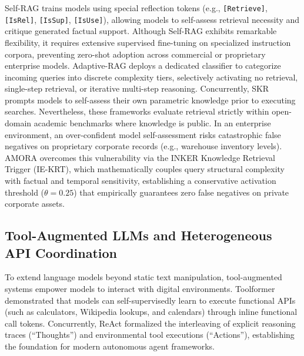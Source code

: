 \documentclass[fleqn,10pt]{article}
\begin{document}
Self-RAG \cite{asai2023selfrag} trains models using special reflection tokens (e.g., \texttt{[Retrieve]}, \texttt{[IsRel]}, \texttt{[IsSup]}, \texttt{[IsUse]}), allowing models to self-assess retrieval necessity and critique generated factual support. Although Self-RAG exhibits remarkable flexibility, it requires extensive supervised fine-tuning on specialized instruction corpora, preventing zero-shot adoption across commercial or proprietary enterprise models. Adaptive-RAG \cite{jeong2024adaptiverag} deploys a dedicated classifier to categorize incoming queries into discrete complexity tiers, selectively activating no retrieval, single-step retrieval, or iterative multi-step reasoning. Concurrently, SKR \cite{wang2023skr} prompts models to self-assess their own parametric knowledge prior to executing searches. Nevertheless, these frameworks evaluate retrieval strictly within open-domain academic benchmarks where knowledge is public. In an enterprise environment, an over-confident model self-assessment risks catastrophic false negatives on proprietary corporate records (e.g., warehouse inventory levels). AMORA overcomes this vulnerability via the INKER Knowledge Retrieval Trigger (IE-KRT), which mathematically couples query structural complexity with factual and temporal sensitivity, establishing a conservative activation threshold ($\theta = 0.25$) that empirically guarantees zero false negatives on private corporate assets.

\subsection{Tool-Augmented LLMs and Heterogeneous API Coordination}
To extend language models beyond static text manipulation, tool-augmented systems empower models to interact with digital environments. Toolformer \cite{schick2023toolformer} demonstrated that models can self-supervisedly learn to execute functional APIs (such as calculators, Wikipedia lookups, and calendars) through inline functional call tokens. Concurrently, ReAct \cite{yao2022react} formalized the interleaving of explicit reasoning traces (``Thoughts'') and environmental tool executions (``Actions''), establishing the foundation for modern autonomous agent frameworks.
\end{document}
